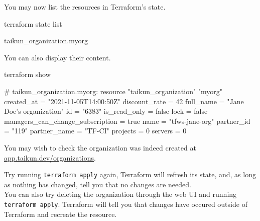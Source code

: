 You may now list the resources in Terraform's state.
\begin{shell}
terraform state list
\end{shell}
\begin{raw}
taikun_organization.myorg
\end{raw}
You can also display their content.
\begin{shell}
terraform show
\end{shell}
\begin{raw}
# taikun_organization.myorg:
resource "taikun_organization" "myorg" {
    created_at                       = "2021-11-05T14:00:50Z"
    discount_rate                    = 42
    full_name                        = "Jane Doe's organization"
    id                               = "6383"
    is_read_only                     = false
    lock                             = false
    managers_can_change_subscription = true
    name                             = "tfws-jane-org"
    partner_id                       = "119"
    partner_name                     = "TF-CI"
    projects                         = 0
    servers                          = 0
}
\end{raw}
You may wish to check the organization was indeed created at
\href{https://app.taikun.dev/organizations}{app.taikun.dev/organizations}.
\begin{tip}
Try running \texttt{terraform apply} again, Terraform will refresh its state, and, as long as
nothing has changed, tell you that no changes are needed.\\

You can also try deleting the organization through the web UI and running \texttt{terraform apply}.
Terraform will tell you that changes have occured outside of Terraform and recreate the resource.
\end{tip}
